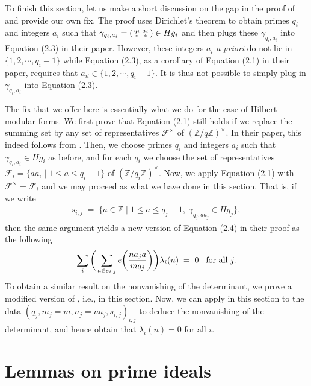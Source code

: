 \documentclass[11pt]{amsart}
\theoremstyle{remark}
\newcommand\sm[1]{\begin{psmallmatrix}#1\end{psmallmatrix}}
\newcommand\cl[1]{\mathcal{#1}}
\newcommand{\inte}{\mathbb{Z}}
\newcommand{\eq}{\;=\;}
\begin{document}
To finish this section, let us make a short discussion on the gap in the proof of \cite[Theorem~2.2]{conjhecke} and provide our own fix. The proof uses Dirichlet's theorem to obtain primes $q_i$ and integers $a_i$ such that $\gamma_{q_i,a_i}=\sm{q_i&a_i\\**&*}\in H g_i$ and then plugs these $\gamma_{q_i,a_i}$ into Equation (2.3) in their paper. However, these integers $a_i$ \textit{a priori} do not lie in $\{1,2,\cdots,q_i-1\}$ while Equation (2.3), as a corollary of Equation (2.1) in their paper, requires that $a_{il}\in\{1,2,\cdots,q_i-1\}$. It is thus not possible to simply plug in $\gamma_{q_i,a_i}$ into Equation (2.3).

The fix that we offer here is essentially what we do for the case of Hilbert modular forms. We first prove that Equation (2.1) still holds if we replace the summing set by any set of representatives $\cl{F}^\times$ of $(\inte/q\inte)^\times$. In their paper, this indeed follows from \cite[Lemma 4.1]{conjhecke}. Then, we choose primes $q_i$ and integers $a_i$ such that $\gamma_{q_i,a_i}\in H g_i$ as before, and for each $q_i$ we choose the set of representatives $\cl{F}_i=\{aa_i\mid 1\leq a\leq q_i-1\}$ of $(\inte/q_i\inte)^\times$. Now, we apply Equation (2.1) with $\cl{F}^\times=\cl{F}_i$ and we may proceed as what we have done in this section. That is, if we write
\begin{align*}
    s_{i,j}\eq\{a\in\inte\mid 1\leq a\leq q_j-1,\; \gamma_{q_j,aa_j}\in H g_j\},
\end{align*}
then the same argument yields a new version of Equation (2.4) in their proof as the following
\begin{align*}
    \sum_{i}\bigg(\sum_{a\in s_{i,j}}e\bigg(\frac{na_ja}{mq_j}\bigg)\bigg)\lambda_i(n)\eq 0 \hspace{0.3cm} \text{for all }j.
\end{align*}
To obtain a similar result on the nonvanishing of the determinant, we prove a modified version of \cite[Lemma~4.5]{conjhecke}, i.e.,  in this section. Now, we can apply  in this section to the data $(q_j,m_j=m,n_j=na_j,s_{i,j})_{i,j}$ to deduce the nonvanishing of the determinant, and hence obtain that \mbox{$\lambda_i(n)=0$} for all $i$.


\appendix

\section{Lemmas on prime ideals}
\label{degree1}
\end{document}
